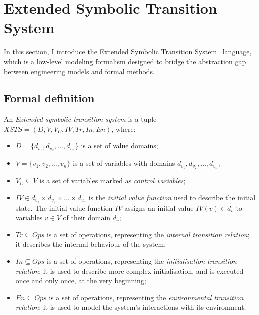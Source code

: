 \section{Extended Symbolic Transition System}\label{sec:xsts}

In this section, I introduce the Extended Symbolic Transition System~\cite{xsts} language, which is a low-level modeling formalism designed to bridge the abstraction gap between engineering models and formal methods.

\subsection{Formal definition}

\begin{definition}
	
	An \emph{Extended symbolic transition system} is a tuple \( \mathit{XSTS} = (D, V, V_C, \mathit{IV}, \mathit{Tr}, \mathit{In}, \mathit{En}) \), where:
	
	\begin{itemize}
		\item \(D = \{ d_{v_1}, d_{v_2}, \dots, d_{v_n} \} \) is a set of value domains;
		\item \(V = \{ v_1, v_2, \dots, v_n \} \) is a set of variables with domains \(d_{v_1}, d_{v_2}, \dots, d_{v_n}\);
		\item \(V_C \subseteq V\) is a set of variables marked as \emph{control variables};
		\item \(\mathit{IV} \in d_{v_1} \times d_{v_2} \times \dots \times d_{v_n}\) is the \emph{initial value function} used to describe the initial state. The initial value function \(\mathit{IV}\) assigns an initial value \(\mathit{IV}(v) \in d_v\) to variables \(v \in V\) of their domain \(d_v\);
		\item \(\mathit{Tr} \subseteq \mathit{Ops}\) is a set of operations, representing the \emph{internal transition relation}; it describes the internal behaviour of the system;
		\item \(\mathit{In} \subseteq \mathit{Ops}\) is a set of operations, representing the \emph{initialisation transition relation}; it is used to describe more complex initialisation, and is executed once and only once, at the very beginning;
		\item \(\mathit{En} \subseteq \mathit{Ops}\) is a set of operations, representing the \emph{environmental transition relation}; it is used to model the system's interactions with its environment.
	\end{itemize}
\end{definition}\label{def:xsts}

